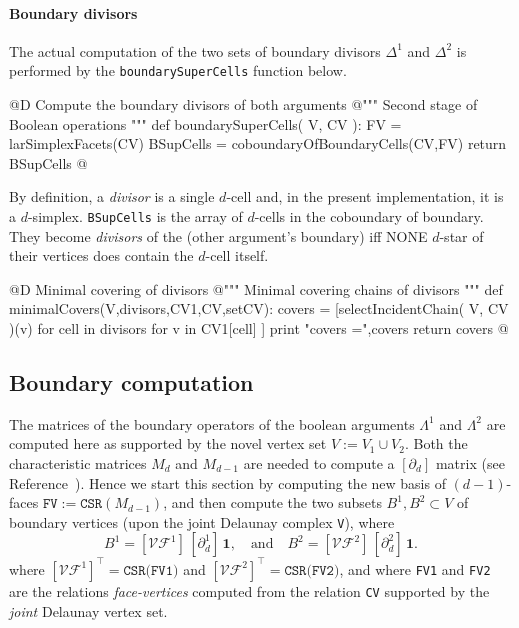 \documentclass[11pt,oneside]{article}	%
\begin{document}
\paragraph{Boundary divisors}
The actual computation of the two sets of boundary divisors $\Delta^1$ and $\Delta^2$ is performed by the \texttt{boundarySuperCells} function below.

@D Compute the boundary divisors of both arguments
@{""" Second stage of Boolean operations """
def boundarySuperCells( V, CV ):
	FV = larSimplexFacets(CV)
	BSupCells = coboundaryOfBoundaryCells(CV,FV)
	return BSupCells
@}


By definition, a \emph{divisor} is a single $d$-cell and, in the present implementation, it is a $d$-simplex. \texttt{BSupCells} is the array of $d$-cells in the coboundary of boundary. They become \emph{divisors} of the (other argument's boundary) iff NONE $d$-star of their vertices does contain the $d$-cell itself.

@D Minimal covering of divisors
@{""" Minimal covering chains of divisors """
def minimalCovers(V,divisors,CV1,CV,setCV):
	covers = [selectIncidentChain( V, CV )(v) for cell in divisors for v in CV1[cell] ]
	print "\n covers =",covers
	return covers
@}




\subsection{Boundary computation}
The matrices of the boundary operators of the boolean arguments $\Lambda^1$ and $\Lambda^2$ are computed here as supported by the novel vertex set $V := V_1 \cup V_2$. Both the characteristic matrices $M_d$ and $M_{d-1}$ are needed to compute a $[\partial_d]$ matrix (see Reference~\cite{Dicarlo:2014:TNL:2543138.2543294}). Hence we start this section by computing the new basis of $(d-1)$-faces $\texttt{FV} := \texttt{CSR}(M_{d-1})$, and then compute the two subsets $B^1,B^2 \subset V$ of boundary vertices (upon the joint Delaunay complex \texttt{V}), where
\[
B^1 = [\mathcal{VF}^1]\, [\partial_d^1]\,\mathbf{1},
\quad\mbox{and}\quad
B^2 = [\mathcal{VF}^2]\, [\partial_d^2]\,\mathbf{1}.
\]
where $[\mathcal{VF}^1]^\top = \texttt{CSR(FV1)}$ and $[\mathcal{VF}^2]^\top = \texttt{CSR(FV2)}$,
and where \texttt{FV1} and \texttt{FV2} are the relations \emph{face-vertices} computed from the relation \texttt{CV} supported by the \emph{joint} Delaunay vertex set. 
\end{document}
